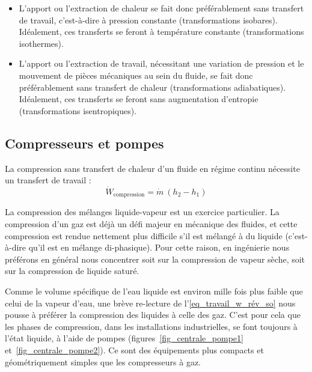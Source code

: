 		\begin{itemize}
			\item L’apport ou l’extraction de chaleur se fait donc préférablement sans transfert de travail, c’est-à-dire à pression constante (transformations isobares). Idéalement, ces transferts se feront à température constante (transformations isothermes).
			\item L’apport ou l’extraction de travail, nécessitant une variation de pression et le mouvement de pièces mécaniques au sein du fluide, se fait donc préférablement sans transfert de chaleur (transformations adiabatiques). Idéalement, ces transferts se feront sans augmentation d’entropie (transformations \mbox{isentropiques}).
		\end{itemize}



	\subsection{Compresseurs et pompes}
	\label{ch_moteurs_vapeur_compresseurs_et_pompes}

		La compression sans transfert de chaleur d’un fluide en régime continu nécessite un transfert de travail :
		\begin{equation}
			\dot{W}_\text{compression} = \dot{m} \ (h_2 - h_1)
		\end{equation}

		La compression des mélanges liquide-vapeur est un exercice particulier. La compression d’un gaz est déjà un défi majeur en mécanique des fluides, et cette compression est rendue nettement plus difficile s’il est mélangé à du liquide (c’est-à-dire qu’il est en mélange di-phasique). Pour cette raison, en ingénierie nous préférons en général nous concentrer soit sur la compression de vapeur sèche, soit sur la compression de liquide saturé.

		Comme le volume spécifique de l’eau liquide est environ mille fois plus faible que celui de la vapeur d’eau, une brève re-lecture de l’\cref{eq_travail_w_rév_so} nous pousse à préférer la compression des liquides à celle des gaz. C’est pour cela que les phases de compression, dans les installations industrielles, se font toujours à l’état liquide, à l’aide de pompes (figures~\ref{fig_centrale_pompe1} et~\ref{fig_centrale_pompe2}). Ce sont des équipements plus compacts et géométriquement simples que les compresseurs à gaz.

